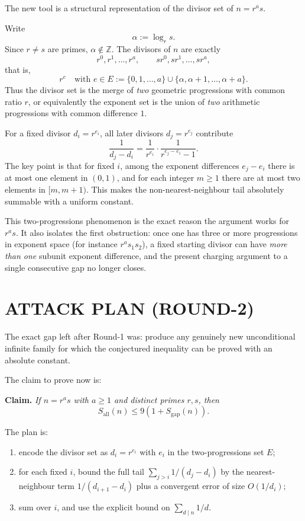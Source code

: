 The new tool is a structural representation of the divisor set of \(n=r^a s\).

Write
\[
\alpha:=\log_r s.
\]
Since \(r\neq s\) are primes, \(\alpha\notin \mathbb Z\). The divisors of \(n\) are exactly
\[
r^0,r^1,\dots,r^a,\qquad s r^0,s r^1,\dots,s r^a,
\]
that is,
\[
r^e \quad \text{with } e\in E:=\{0,1,\dots,a\}\cup \{\alpha,\alpha+1,\dots,\alpha+a\}.
\]
Thus the divisor set is the merge of \emph{two} geometric progressions with common ratio \(r\), or equivalently the exponent set is the union of \emph{two} arithmetic progressions with common difference \(1\).

For a fixed divisor \(d_i=r^{e_i}\), all later divisors \(d_j=r^{e_j}\) contribute
\[
\frac{1}{d_j-d_i}
=
\frac{1}{r^{e_i}}\cdot \frac{1}{r^{e_j-e_i}-1}.
\]
The key point is that for fixed \(i\), among the exponent differences \(e_j-e_i\) there is at most one element in \((0,1)\), and for each integer \(m\geq 1\) there are at most two elements in \([m,m+1)\). This makes the non-nearest-neighbour tail absolutely summable with a uniform constant.

This two-progressions phenomenon is the exact reason the argument works for \(r^a s\). It also isolates the first obstruction: once one has three or more progressions in exponent space (for instance \(r^a s_1 s_2\)), a fixed starting divisor can have \emph{more than one} subunit exponent difference, and the present charging argument to a single consecutive gap no longer closes.

\section{ATTACK PLAN (ROUND-2)}

The exact gap left after Round-1 was: produce any genuinely new unconditional infinite family for which the conjectured inequality can be proved with an absolute constant.

The claim to prove now is:

\medskip

\noindent\textbf{Claim.}
\emph{If \(n=r^a s\) with \(a\geq 1\) and distinct primes \(r,s\), then}
\[
S_{\mathrm{all}}(n)\leq 9(1+S_{\mathrm{gap}}(n)).
\]

\medskip

The plan is:

\begin{enumerate}
\item encode the divisor set as \(d_i=r^{e_i}\) with \(e_i\) in the two-progressions set \(E\);
\item for each fixed \(i\), bound the full tail \(\sum_{j>i}1/(d_j-d_i)\) by the nearest-neighbour term \(1/(d_{i+1}-d_i)\) plus a convergent error of size \(O(1/d_i)\);
\item sum over \(i\), and use the explicit bound on \(\sum_{d\mid n}1/d\).
\end{enumerate}

